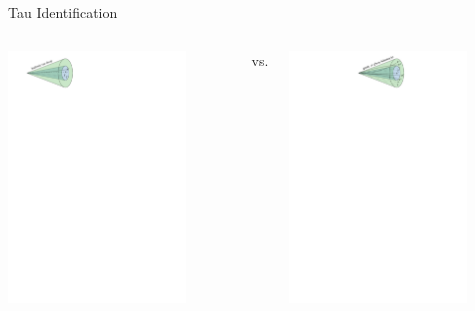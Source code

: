 \documentclass[11pt, xcolor={dvipsnames}, aspectratio=169]{beamer}
\begin{document}
\begin{frame}{Tau Identification}
  \begin{columns}
    \centering
    \includegraphics[width=0.8\textwidth]{tauid/cone_tauhad}

    \centering

    vs.

    \includegraphics[width=0.8\textwidth]{tauid/cone_qgjet}
  \end{columns}


\end{frame}
\end{document}
